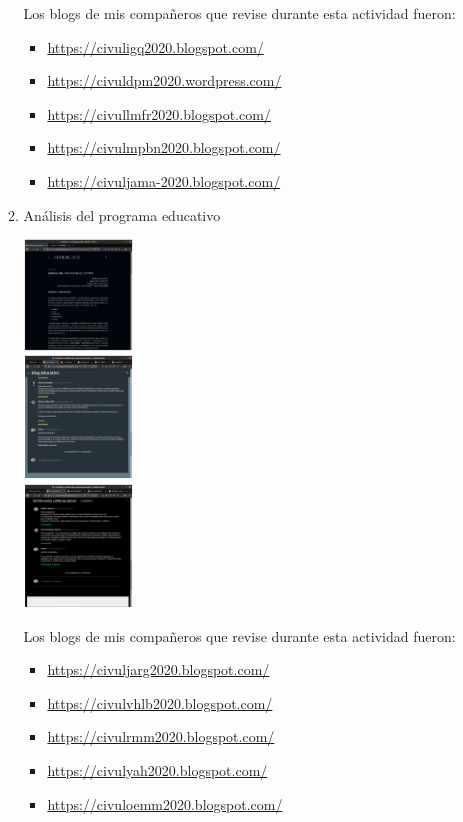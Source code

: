 \documentclass[12pt]{article}
\begin{document}
\begin{enumerate}[{\bf Sesi\'on} 1{.}]
\begin{enumerate}[{\bf Actividad} 1{.}]
					\par Los blogs de mis compa\~neros que revise durante esta actividad fueron:
						\begin{itemize}
							\item \url {https://civuligq2020.blogspot.com/}
							\item \url {https://civuldpm2020.wordpress.com/}
							\item \url {https://civullmfr2020.blogspot.com/}
							\item \url {https://civulmpbn2020.blogspot.com/}
							\item \url {https://civuljama-2020.blogspot.com/}
						\end{itemize}
						
				\item {Análisis del programa educativo}
				
					\begin{multicols}{3}			
						\includegraphics[width=0.24\textwidth] {CIVUL-U1-S3-A3-1}\\
						\includegraphics[width=0.24\textwidth] {CIVUL-U1-S3-A3-2-1}\\
						\includegraphics[width=0.24\textwidth] {CIVUL-U1-S3-A3-2-2}
					\end{multicols}
					
					\par Los blogs de mis compa\~neros que revise durante esta actividad fueron:
						\begin{itemize}
							\item \url {https://civuljarg2020.blogspot.com/}
							\item \url {https://civulvhlb2020.blogspot.com/}
							\item \url {https://civulrmm2020.blogspot.com/}
							\item \url {https://civulyah2020.blogspot.com/}
							\item \url {https://civuloemm2020.blogspot.com/}
						\end{itemize}
				

\end{enumerate}
\end{enumerate}
\end{document}
